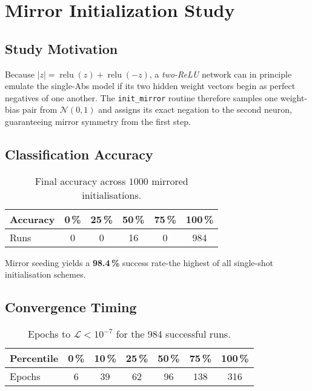 \section{Mirror Initialization Study}
\label{sec:relu1-mirror}

\subsection*{Study Motivation}
Because \(|z| = \operatorname{relu}(z) + \operatorname{relu}(-z)\), a
\emph{two-ReLU} network can in principle emulate the single-Abs model if
its two hidden weight vectors begin as perfect negatives of one another.
The \texttt{init\_mirror} routine therefore samples one weight-bias pair
from \(\mathcal N(0,1)\) and assigns its exact negation to the second
neuron, guaranteeing mirror symmetry from the first step.

\subsection*{Classification Accuracy}

\begin{table}[ht]
\centering
\caption{Final accuracy across $1000$ mirrored initialisations.}
\label{tab:relu1-mirror-accuracy}
\begin{tabular}{lccccc}
\toprule
Accuracy & 0\,\% & 25\,\% & 50\,\% & 75\,\% & 100\,\% \\
\midrule
Runs & 0 & 0 & 16 & 0 & 984 \\
\bottomrule
\end{tabular}
\end{table}

Mirror seeding yields a \textbf{98.4\,\%} success rate-the highest of
all single-shot initialisation schemes.

\subsection*{Convergence Timing}

\begin{table}[ht]
\centering
\caption{Epochs to $\mathcal L<10^{-7}$ for the 984 successful runs.}
\label{tab:relu1-mirror-epochs}
\begin{tabular}{lcccccc}
\toprule
Percentile & 0\,\% & 10\,\% & 25\,\% & 50\,\% & 75\,\% & 100\,\% \\ \midrule
Epochs & 6 & 39 & 62 & 96 & 138 & 316 \\
\bottomrule
\end{tabular}
\end{table}

